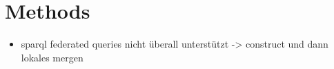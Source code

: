 \chapter{Methods}
\label{cha:methods}

\begin{itemize}
\item sparql federated queries nicht überall unterstützt -> construct und dann lokales mergen
\end{itemize}

